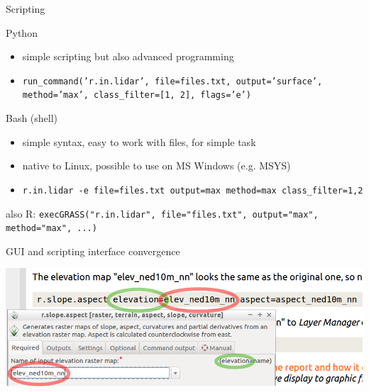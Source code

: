 \documentclass[xcolor={dvipsnames,usenames},beamer,aspectratio=169]{beamer}
\begin{document}
\begin{frame}{Scripting}

\begin{block}{Python}
 \begin{itemize}
  \item simple scripting but also advanced programming
  \item \texttt{run\_command('r.in.lidar', file=files.txt, output='surface', method='max', class\_filter=[1, 2], flags='e')}
 \end{itemize}
\end{block}

\begin{block}{Bash (shell)}
 \begin{itemize}
  \item simple syntax, easy to work with files, for simple task
  \item native to Linux, possible to use on MS Windows (e.g. MSYS)
  \item \texttt{r.in.lidar -e file=files.txt output=max method=max class\_filter=1,2}
 \end{itemize}
\end{block}

\begin{small}
also R: \texttt{execGRASS("r.in.lidar", file="files.txt", output="max", method="max", ...)}
\end{small}

\end{frame}

\begin{frame}{GUI and scripting interface convergence}

\centering
\includegraphics[width=\textwidth]{grass/grass_cmd_gui}%

\end{frame}
\end{document}
